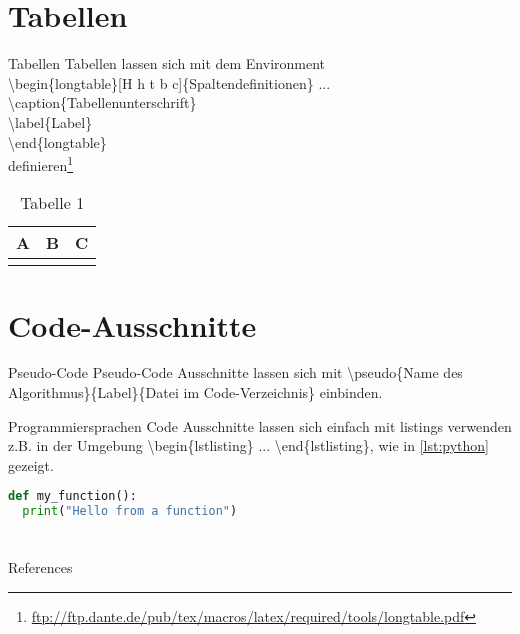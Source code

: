 \documentclass[10pt,aspectratio=\ratio,
compress
]{beamer}
\newcommand\meta{./meta}
\begin{document}
\section{Tabellen}
\begin{frame}{Tabellen}
Tabellen lassen sich mit dem Environment\\
\textbackslash begin\{longtable\}[H h t b c]\{Spaltendefinitionen\} ...\\
\qquad\qquad \textbackslash caption\{Tabellenunterschrift\}\\
\qquad\qquad \textbackslash label\{Label\}\\
\textbackslash end\{longtable\}\\
 definieren\footnote{\url{ftp://ftp.dante.de/pub/tex/macros/latex/required/tools/longtable.pdf}}\\
\begin{longtable}[H]{|p{}|p{}|p{}|}
\hline
A&B&C\\
\hline
\caption{Tabelle 1}
\label{tab:tab1}
\end{longtable}
\end{frame}

\section{Code-Ausschnitte}

\begin{frame}[containsverbatim]{Pseudo-Code}
Pseudo-Code Ausschnitte lassen sich mit \textbackslash pseudo\{Name des Algorithmus\}\{Label\}\{Datei im Code-Verzeichnis\} einbinden.
\end{frame}

\begin{frame}[containsverbatim]{Programmiersprachen}
Code Ausschnitte lassen sich einfach mit listings verwenden z.B. in der Umgebung \textbackslash begin\{lstlisting\} ... \textbackslash end\{lstlisting\}, wie in \autoref{lst:python} gezeigt.

\begin{lstlisting}[language=Python, caption={Simple Python program}, label=lst:python]
def my_function():
  print("Hello from a function")
\end{lstlisting}
\end{frame}


\section*{}
\begin{frame}[allowframebreaks]{References}
 \def\newblock{\hskip .11em plus .33em minus .07em}
 \scriptsize
 
 
 \normalsize
\end{frame}

\end{document}
